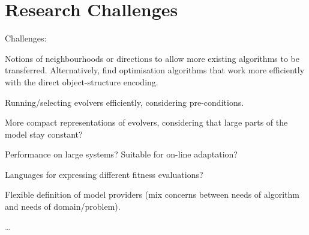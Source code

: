\section{Research Challenges}
\label{section:research_challenges}

	\begin{draftlist}
		Challenges:
		\item Notions of neighbourhoods or directions to allow more existing algorithms to be transferred. Alternatively, find optimisation algorithms that work more
					efficiently with the direct object-structure encoding.
		\item Running/selecting evolvers efficiently, considering pre-conditions.
		\item More compact representations of evolvers, considering that large parts of the model stay constant?
		\item Performance on large systems? Suitable for on-line adaptation?
		\item Languages for expressing different fitness evaluations?
		\item Flexible definition of model providers (mix concerns between needs of algorithm and needs of domain/problem).
		\item \ldots
	\end{draftlist}
